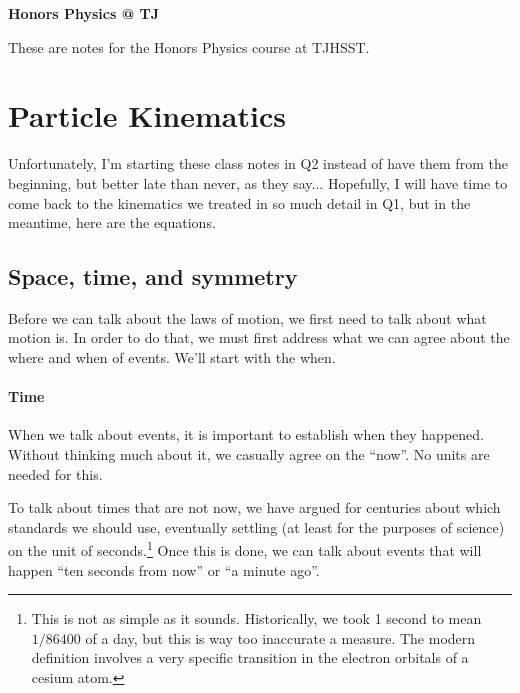 {\center
{\color{violet}\fontsize{28pt}{34pt}\bf\sffamily 
Honors Physics @ TJ
\\[.5in]
}

}
{\abstract
These are notes for the Honors Physics course at TJHSST. 
}



{
\linespread{.8}
\small
\tableofcontents
}

\thispagestyle{empty}
\newpage
\section{Particle Kinematics}

Unfortunately, I'm starting these class notes in Q2 instead of have them from the beginning, but better late than never, as they say...
Hopefully, I will have time to come back to the kinematics we treated in so much detail in Q1, but in the meantime, here are the equations.

\subsection{Space, time, and symmetry}

Before we can talk about the laws of motion, we first need to talk about what motion is. In order to do that, we must first address what we can agree about the where and when of events. We'll start with the when.

\paragraph{Time}
When we talk about events, it is important to establish when they happened. Without thinking much about it, we casually agree on the “now”. No units are needed for this. 

To talk about times that are not now, we have argued for centuries about which standards we should use, eventually settling (at least for the purposes of science) on the unit of seconds.\footnote{This is not as simple as it sounds. Historically, we took 1 second to mean $1/86400$ of a day, but this is way too inaccurate a measure. The modern definition involves a very specific transition in the electron orbitals of a cesium atom.} Once this is done, we can talk about events that will happen “ten seconds from now” or “a minute ago”. 

